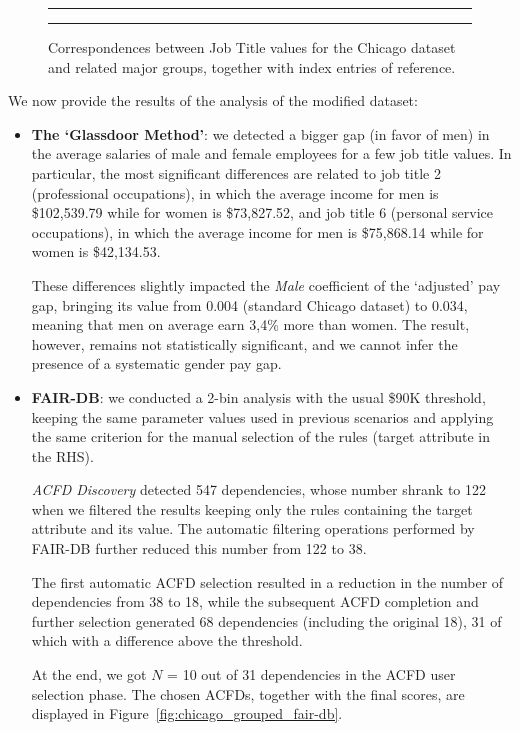 \begin{figure}[t!]
\centering
\noindent\rule{\linewidth}{0.4pt}\par
\noindent\rule{\linewidth}{0.4pt}
\caption{Correspondences between \textrm{Job Title} values for the Chicago dataset and related major groups, together with index entries of reference.}
\label{fig:encodings}
\end{figure}

We now provide the results of the analysis of the modified dataset:
\begin{itemize}
\item \textbf{The `Glassdoor Method'}: we detected a bigger gap (in favor of men) in the average salaries of male and female employees for a few job title values. In particular, the most significant differences are related to job title 2 (professional occupations), in which the average income for men is \$102,539.79 while for women is \$73,827.52, and job title 6 (personal service occupations), in which the average income for men is \$75,868.14 while for women is \$42,134.53.

These differences slightly impacted the \textit{Male} coefficient of the `adjusted' pay gap, bringing its value from 0.004 (standard Chicago dataset) to 0.034, meaning that men on average earn 3,4\% more than women. The result, however, remains not statistically significant, and we cannot infer the presence of a systematic gender pay gap.
\item \textbf{FAIR-DB}: we conducted a 2-bin analysis with the usual \$90K threshold, keeping the same parameter values used in previous scenarios and applying the same criterion for the manual selection of the rules (target attribute in the RHS).

\textit{ACFD Discovery} detected 547 dependencies, whose number shrank to 122 when we filtered the results keeping only the rules containing the target attribute and its value. The automatic filtering operations performed by FAIR-DB further reduced this number from 122 to 38.

The first automatic ACFD selection resulted in a reduction in the number of dependencies from 38 to 18, while the subsequent ACFD completion and further selection generated 68 dependencies (including the original 18), 31 of which with a difference above the threshold.

At the end, we got \(N\) = 10 out of 31 dependencies in the ACFD user selection phase. The chosen ACFDs, together with the final scores, are displayed in Figure~\ref{fig:chicago_grouped_fair-db}.


\end{itemize}
